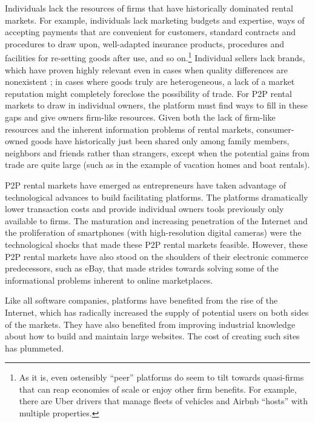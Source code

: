 \documentclass[11pt]{article}
\begin{document}
Individuals lack the resources of firms that have historically dominated rental markets. 
For example, individuals lack marketing budgets and expertise, ways of accepting payments that are convenient for customers, standard contracts and procedures to draw upon, well-adapted insurance products, procedures and facilities for re-setting goods after use, and so on.\footnote{
  As it is, even ostensibly ``peer'' platforms do seem to tilt towards quasi-firms that can reap economies of scale or enjoy other firm benefits.
  For example, there are Uber drivers that manage fleets of vehicles and Airbnb ``hosts'' with multiple properties. 
}
Individual sellers lack brands, which have proven highly relevant even in cases when quality differences are nonexistent \citep{bronnenberg2014pharmacists}; in cases where goods truly are heterogeneous, a lack of a market reputation might completely foreclose the possibility of trade.  
For P2P rental markets to draw in individual owners, the platform must find ways to fill in these gaps and give owners firm-like resources. 
Given both the lack of firm-like resources and the inherent information problems of rental markets, consumer-owned goods have historically just been shared only among family members, neighbors and friends rather than strangers, except when the potential gains from trade are quite large (such as in the example of vacation homes and boat rentals). 

P2P rental markets have emerged as entrepreneurs have taken advantage of technological advances to build facilitating platforms. 
The platforms dramatically lower transaction costs and provide individual owners tools previously only available to firms. 
The maturation and increasing penetration of the Internet and the proliferation of smartphones (with high-resolution digital cameras) were the technological shocks that made these P2P rental markets feasible. 
However, these P2P rental markets have also stood on the shoulders of their electronic commerce predecessors, such as eBay, that made strides towards solving some of the informational problems inherent to online marketplaces. 

Like all software companies, platforms have benefited from the rise of the Internet, which has radically increased the supply of potential users on both sides of the markets. 
They have also benefited from improving industrial knowledge about how to build and maintain large websites.
The cost of creating such sites has plummeted. 
\end{document}
